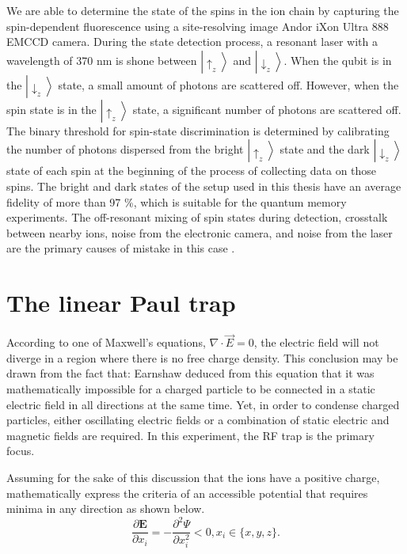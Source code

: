 We are able to determine the state of the spins in the ion chain by capturing the spin-dependent fluorescence using a site-resolving image Andor iXon Ultra 888 EMCCD camera. During the state detection process, a resonant laser with a wavelength of 370 nm is shone between $\left|\uparrow_z\right\rangle$ and $\left|\downarrow_z\right\rangle$. When the qubit is in the $\left|\downarrow_z\right\rangle$ state, a small amount of photons are scattered off. However, when the spin state is in the $\left|\uparrow_z\right\rangle$ state, a significant number of photons are scattered off. The binary threshold for spin-state discrimination is determined by calibrating the number of photons dispersed from the bright $\left|\uparrow_z\right\rangle$ state and the dark $\left|\downarrow_z\right\rangle$ state of each spin at the beginning of the process of collecting data on those spins. The bright and dark states of the setup used in this thesis have an average fidelity of more than 97 \%, which is suitable for the quantum memory experiments. The off-resonant mixing of spin states during detection, crosstalk between nearby ions, noise from the electronic camera, and noise from the laser are the primary causes of mistake in this case \cite{RN128}.


\section{The linear Paul trap}

According to one of Maxwell's equations, $\nabla \cdot \vec{E}=0$, the electric field will not diverge in a region where there is no free charge density. This conclusion may be drawn from the fact that: Earnshaw deduced from this equation that it was mathematically impossible for a charged particle to be connected in a static electric field in all directions at the same time. Yet, in order to condense charged particles, either oscillating electric fields or a combination of static electric and magnetic fields are required. In this experiment, the RF trap is the primary focus.

Assuming for the sake of this discussion that the ions have a positive charge, mathematically express the criteria of an accessible potential that requires minima in any direction as shown below.
\begin{equation}\label{eq:minima}
    \frac{\partial \mathbf{E}}{\partial x_i}=-\frac{\partial^2 \Psi}{\partial x_i^2}<0, x_i \in\{x, y, z\}.
\end{equation}

